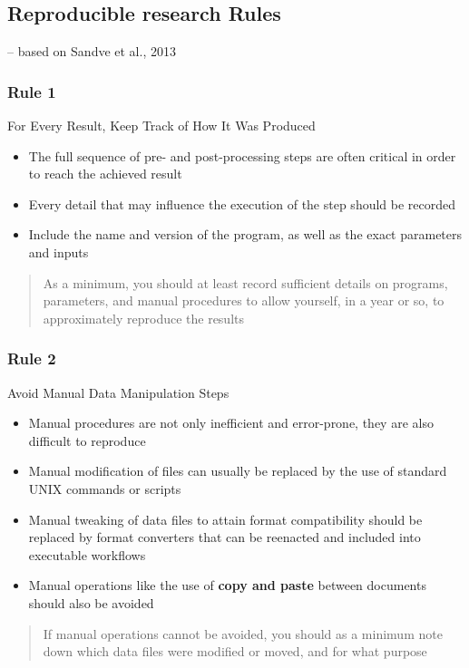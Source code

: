 \documentclass{beamer}
\begin{document}
\begin{frame}
\section{Reproducible research Rules}
\vspace{30pt}
\scriptsize  
\raggedleft -- based on Sandve et al., 2013 \citep{Sandve:2013gh}
\end{frame}
\begin{frame}
\frametitle{Rule 1}
{\sc For Every Result, Keep Track of How It Was Produced}
\begin{itemize}
    \item  The full sequence of pre- and post-processing steps are often critical in order to reach the achieved result
    \item Every detail that may influence the execution of the step should be recorded
    \item Include the name and version of the program, as well as the exact parameters and inputs
\end{itemize}
\begin{quote}As a minimum, you should at least record sufficient details on programs, parameters, and manual procedures to allow yourself, in a year or so, to approximately reproduce the results\end{quote}
\end{frame}
\begin{frame}
\frametitle{Rule 2}
{\sc Avoid Manual Data Manipulation Steps}
\begin{itemize}
    \item Manual procedures are not only inefficient and error-prone, they are also difficult to reproduce
    \item Manual modification of files can usually be replaced by the use of standard UNIX commands or scripts
    \item Manual tweaking of data files to attain format compatibility should be replaced by format converters that can be reenacted and included into executable workflows
    \item Manual operations like the use of \textbf{copy and paste} between documents should also be avoided
\end{itemize}
\begin{quote}
If manual operations cannot be avoided, you should as a minimum note down which data files were modified or moved, and for what purpose
\end{quote}

\end{frame}
\end{document}

